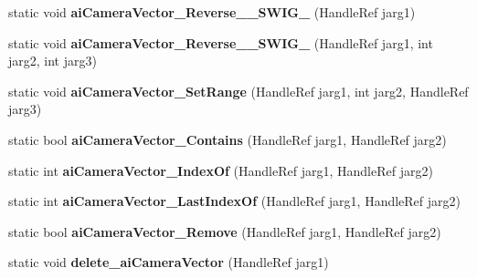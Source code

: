\begin{DoxyCompactItemize}
\item 
\hypertarget{class_assimp_p_i_n_v_o_k_e_af547e842287c3e7ddeee47d01caecc31}{static void {\bfseries ai\+Camera\+Vector\+\_\+\+Reverse\+\_\+\+\_\+\+S\+W\+I\+G\+\_} (Handle\+Ref jarg1)}\label{class_assimp_p_i_n_v_o_k_e_af547e842287c3e7ddeee47d01caecc31}

\item 
\hypertarget{class_assimp_p_i_n_v_o_k_e_a12a6128ac067621144b17bbd0b24851e}{static void {\bfseries ai\+Camera\+Vector\+\_\+\+Reverse\+\_\+\+\_\+\+S\+W\+I\+G\+\_} (Handle\+Ref jarg1, int jarg2, int jarg3)}\label{class_assimp_p_i_n_v_o_k_e_a12a6128ac067621144b17bbd0b24851e}

\item 
\hypertarget{class_assimp_p_i_n_v_o_k_e_a71c1ec34066764a01f6bbe39b62ac66b}{static void {\bfseries ai\+Camera\+Vector\+\_\+\+Set\+Range} (Handle\+Ref jarg1, int jarg2, Handle\+Ref jarg3)}\label{class_assimp_p_i_n_v_o_k_e_a71c1ec34066764a01f6bbe39b62ac66b}

\item 
\hypertarget{class_assimp_p_i_n_v_o_k_e_a19cace23bc57c08269533437035c7f0c}{static bool {\bfseries ai\+Camera\+Vector\+\_\+\+Contains} (Handle\+Ref jarg1, Handle\+Ref jarg2)}\label{class_assimp_p_i_n_v_o_k_e_a19cace23bc57c08269533437035c7f0c}

\item 
\hypertarget{class_assimp_p_i_n_v_o_k_e_afd8bfdebc315d435e09c722b41446b10}{static int {\bfseries ai\+Camera\+Vector\+\_\+\+Index\+Of} (Handle\+Ref jarg1, Handle\+Ref jarg2)}\label{class_assimp_p_i_n_v_o_k_e_afd8bfdebc315d435e09c722b41446b10}

\item 
\hypertarget{class_assimp_p_i_n_v_o_k_e_a176b9fcab43ee436b7849b7bf5fcb6b5}{static int {\bfseries ai\+Camera\+Vector\+\_\+\+Last\+Index\+Of} (Handle\+Ref jarg1, Handle\+Ref jarg2)}\label{class_assimp_p_i_n_v_o_k_e_a176b9fcab43ee436b7849b7bf5fcb6b5}

\item 
\hypertarget{class_assimp_p_i_n_v_o_k_e_a6bed9e21525d29e31170dd4d2c3cd698}{static bool {\bfseries ai\+Camera\+Vector\+\_\+\+Remove} (Handle\+Ref jarg1, Handle\+Ref jarg2)}\label{class_assimp_p_i_n_v_o_k_e_a6bed9e21525d29e31170dd4d2c3cd698}

\item 
\hypertarget{class_assimp_p_i_n_v_o_k_e_a75b9077206e8c1d044a6814f7fa3c841}{static void {\bfseries delete\+\_\+ai\+Camera\+Vector} (Handle\+Ref jarg1)}\label{class_assimp_p_i_n_v_o_k_e_a75b9077206e8c1d044a6814f7fa3c841}


\end{DoxyCompactItemize}
